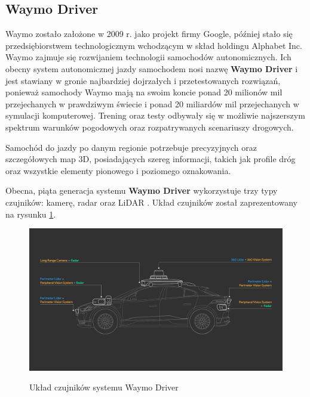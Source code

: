 \subsection{Waymo Driver}
Waymo zostało założone w 2009 r. jako projekt firmy Google, później stało się przedsiębiorstwem technologicznym wchodzącym w skład holdingu Alphabet Inc. Waymo zajmuje się rozwijaniem technologii samochodów autonomicznych. Ich obecny system autonomicznej jazdy samochodem nosi nazwę \textbf{Waymo Driver} i jest stawiany w gronie najbardziej dojrzałych i przetestowanych rozwiązań, ponieważ samochody Waymo mają na swoim koncie ponad 20 milionów mil przejechanych w prawdziwym świecie i ponad 20 miliardów mil przejechanych w symulacji komputerowej. Trening oraz testy odbywały się w możliwie najszerszym spektrum warunków pogodowych oraz rozpatrywanych scenariuszy drogowych.

Samochód do jazdy po danym regionie potrzebuje precyzyjnych oraz szczegółowych map 3D, posiadających szereg informacji, takich jak profile dróg oraz wszystkie elementy pionowego i poziomego oznakowania.

Obecna, piąta generacja systemu \textbf{Waymo Driver} wykorzystuje trzy typy czujników: kamerę, radar oraz LiDAR \cite{waymoDriver:5thGenSensors}. Układ czujników został zaprezentowany na rysunku \ref{WaymoDriverSensors}. \\

\begin{figure}[h]
\begin{center}
\includegraphics[width=15cm]{resources/figures/waymo_driver_sensors.png}
\caption{Układ czujników systemu Waymo Driver}
\label{WaymoDriverSensors}
\end{center}
\end{figure}

